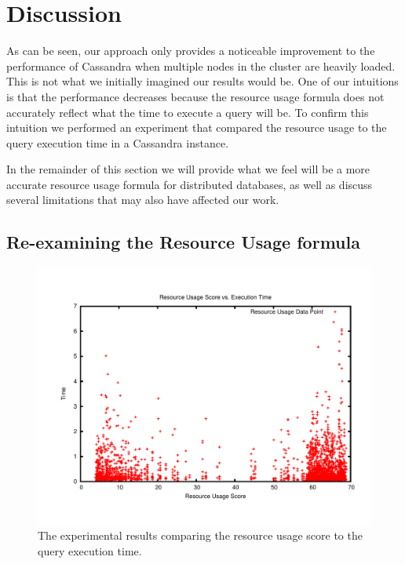 \section{Discussion}
\label{sec:discussion}

As can be seen, our approach only provides a noticeable improvement to the performance of Cassandra when multiple nodes in the cluster are heavily loaded. This is not what we initially imagined our results would be. One of our intuitions is that the performance decreases because the resource usage formula does not accurately reflect what the time to execute a query will be. To confirm this intuition we performed an experiment that compared the resource usage to the query execution time in a Cassandra instance.

In the remainder of this section we will provide what we feel will be a more accurate resource usage formula for distributed databases, as well as discuss several limitations that may also have affected our work.

\subsection{Re-examining the Resource Usage formula}
\label{sec:examineResUse}

\begin{figure}[t]
\centering
\includegraphics[scale=0.3]{images/ResUse.pdf}
\vspace{-15pt}
\caption{The experimental results comparing the resource usage score to the query execution time.}
\label{fig:resourceUsageFig}
\end{figure}

